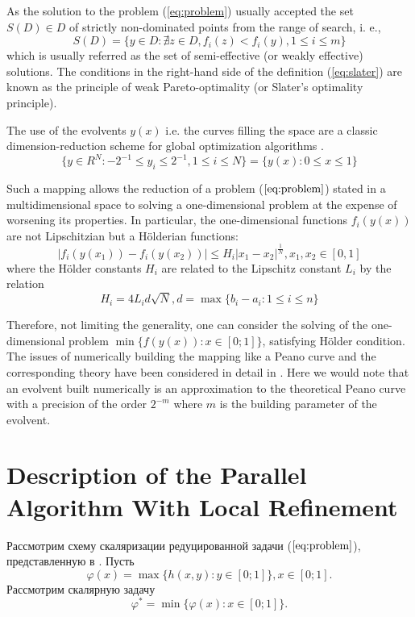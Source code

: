 \documentclass{llncs}
\begin{document}
As the solution to the problem (\ref{eq:problem}) usually accepted the set \(S(D)\in D\) of  strictly non-dominated points from the range of search, i. e.,
\begin{equation}
  \label{eq:slater}
  S(D) = \{y\in D: \nexists z\in D, f_i(z)<f_i(y),1\leqslant i \leqslant m\}
\end{equation}
which is usually referred as the set of semi-effective (or weakly effective) solutions. The conditions in the right-hand side of the definition (\ref{eq:slater}) are known as the principle of weak Pareto-optimality (or Slater's optimality principle).

The use of the evolvents \(y(x)\) i.e. the curves filling the space are a classic dimension-reduction scheme for global optimization algorithms \cite{evolvents2013}.
\begin{displaymath}
\label{cube}
\lbrace y\in R^N:-2^{-1}\leqslant y_i\leqslant 2^{-1},1\leqslant i\leqslant N\rbrace=\{y(x):0\leqslant x\leqslant 1\}
\end{displaymath}
\par
Such a mapping allows the reduction of a problem (\(\ref{eq:problem}\)) stated in a multidimensional space to solving a one-dimensional problem at the expense of worsening its properties.
In particular, the one-dimensional functions \(f_i(y(x))\) are not Lipschitzian but a Hölderian functions:
\begin{equation}
\label{eq:holder}
|f_i(y(x_1))-f_i(y(x_2))|\leqslant H_i{|x_1-x_2|}^{\frac{1}{N}},x_1,x_2\in[0,1]
\end{equation}
where the Hölder constants \(H_i\) are related to the Lipschitz constant \(L_i\) by the relation
\begin{displaymath}
H_i=4L_id\sqrt{N},d=\max\{b_i-a_i:1\leqslant i\leqslant n\}
\end{displaymath}
\par
Therefore, not limiting the generality, one can consider the solving of the
one-dimensional problem \(\min\{f(y(x)): x\in [0;1]\}\), satisfying Hölder condition. The issues of numerically building the mapping like a Peano curve and the corresponding theory have been considered in detail in \cite{evolvents2013}. Here we would note that an evolvent built numerically is an approximation to the theoretical Peano curve with a precision of the order \(2^{-m}\) where \(m\) is the building parameter of the evolvent.

\section{Description of the Parallel Algorithm With Local Refinement}
\label{sec:algorithm}
Рассмотрим схему скаляризации редуцированной задачи (\(\ref{eq:problem}\)), представленную в \cite{markinStrongin1993}. Пусть
\begin{equation}
  \varphi(x)=\max\{h(x,y):y\in [0;1]\},x\in [0;1].
\end{equation}
Рассмотрим скалярную задачу
\begin{equation}
  \label{eq:aux_problem}
  \varphi^*=\min\{\varphi(x):x\in [0;1]\}.
\end{equation}
\end{document}
